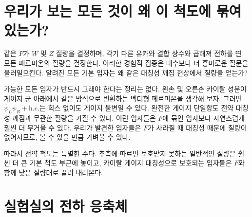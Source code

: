 \section{우리가 보는 모든 것이 왜 이 척도에 묶여 있는가?}

같은 \(F\)가 \(W\) 및 \(Z\) 질량을 결정하며, 각기 다른 유카와 결합 상수와 곱해져 전하를 띤 모든 페르미온의 질량을 결정한다. 이러한 경험적 집중은 대수보다 더 흥미로운 질문을 불러일으킨다. 알려진 모든 기본 입자는 왜 같은 대칭성 깨짐 현상에서 질량을 얻는가?

가능한 모든 입자가 반드시 그래야 한다는 정리는 없다. 왼손 및 오른손 카이랄 성분이 게이지 군 아래에서 같은 방식으로 변환하는 벡터형 페르미온을 생각해 보자. 그러면 \(\bar\psi_L\psi_R+\mathrm{h.c.}\)는 힉스 없이도 게이지 불변일 수 있다. 완전한 게이지 단일항도 전약 대칭성 깨짐과 무관한 질량을 가질 수 있다. 이런 입자들은 \(F\)에 묶인 입자보다 자연스럽게 훨씬 더 무거울 수 있다. 우리가 발견한 입자들은 \(F\)가 사라질 때 대칭성 때문에 질량이 없어지므로, 볼 수 있을 만큼 가벼울 수 있다.

따라서 전약 척도는 특별한 수다. 추측에 따르면 보호받지 못하는 일반적인 질량은 훨씬 더 큰 기본 척도 부근에 놓이고, 카이랄 게이지 대칭성으로 보호되는 입자들은 \(F\)와 함께 낮은 질량대로 끌려 내려온다.

\begin{classroomqa}
\end{classroomqa}

\begin{classroomqa}
\end{classroomqa}

\section{실험실의 전하 응축체}


